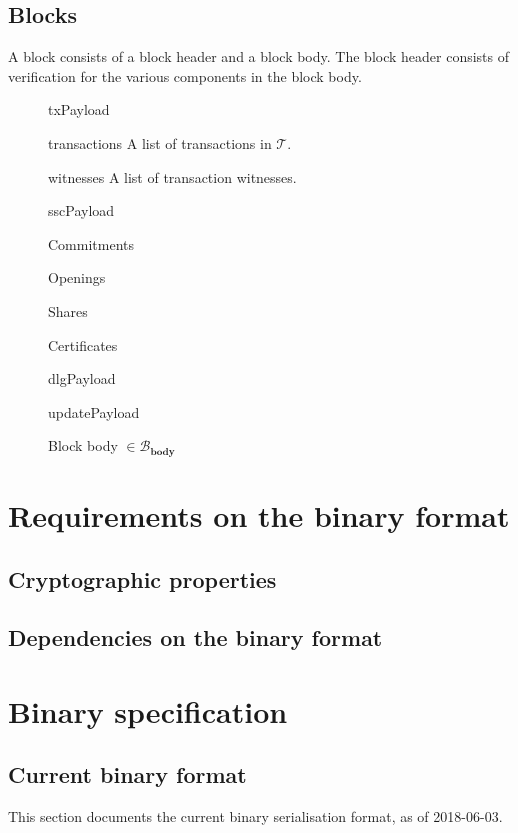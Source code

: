 \documentclass{article}
\newcommand{\txs}{\mathcal{T}}
\newcommand{\blocks}{\mathcal{B}}
\newcommand{\bbodies}{\blocks_{\textbf{body}}}
\begin{document}
\subsection{Blocks}

A block consists of a block header and a block body. The block header consists
of verification for the various components in the block body.

\begin{figure}[H]
  \caption{Block body $\in\bbodies$}
  \begin{record}
    \item [txPayload] \hfill
      \begin{record}
        \item [transactions] A list of transactions in $\txs$.
        \item [witnesses] A list of transaction witnesses.
      \end{record}

    \item [sscPayload] \hfill
      \begin{variant}
        \item [Commitments]
        \item [Openings]
        \item [Shares]
        \item [Certificates]
      \end{variant}

    \item [dlgPayload]
    \item [updatePayload]
  \end{record}
  \label{fig:blockbody}
\end{figure}

\section{Requirements on the binary format}
\label{sec:reqs}

\subsection{Cryptographic properties}

\subsection{Dependencies on the binary format}

\section{Binary specification}
\label{sec:binfmt}

\begin{appendices}
  \section{Current binary format}
  \label{sec:currentfmt}

  This section documents the current binary serialisation format, as of
  2018-06-03.
\end{appendices}
\end{document}
